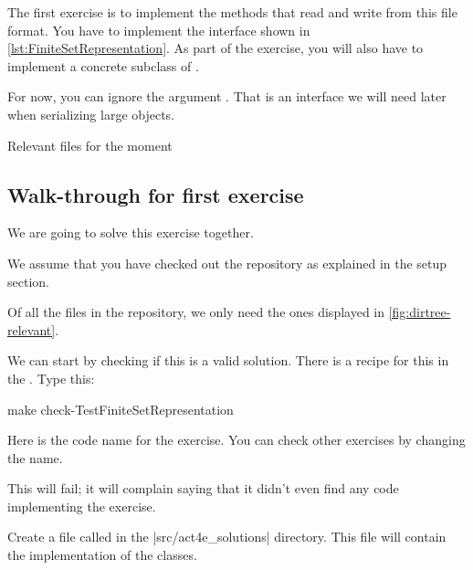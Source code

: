 \begin{codeexercise}
    \label{ex:setrepr}
    The first exercise is to implement the methods that read and write from this file format.
    You have to implement the interface \FiniteSetRepresentation shown in \cref{lst:FiniteSetRepresentation}.
    As part of the exercise, you will also have to implement a concrete subclass of \FiniteSet.
\end{codeexercise}

\begin{longcode}
    \centering
    \caption{}\label{lst:FiniteSetRepresentation}
\end{longcode}

For now, you can ignore the argument .
That is an interface we will need later when serializing large objects.

%
\begin{marginfigure}
    \caption{Relevant files for the moment}
    \label{fig:dirtree-relevant}
\end{marginfigure}

\subsection{Walk-through for first exercise}

We are going to solve this exercise together.

We assume that you have checked out the repository as explained in the setup section.

Of all the files in the repository, we only need the ones displayed in \cref{fig:dirtree-relevant}.

We can start by checking if this is a valid solution.
There is a recipe for this in the .
Type this:

\begin{console}
    make check-TestFiniteSetRepresentation
\end{console}

Here  is the code name for the exercise.
You can check other exercises by changing the name.

This will fail; it will complain saying that it didn't even find any code implementing the exercise.

Create a file called  in the \files|src/act4e_solutions| directory.
This file will contain the implementation of the classes.

